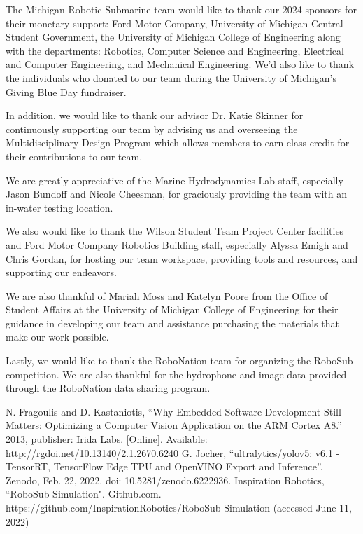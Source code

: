 \documentclass[conference]{IEEEtran}
\begin{document}
The Michigan Robotic Submarine team would like to thank our 2024 sponsors for their monetary support: Ford Motor Company, University of Michigan Central Student Government, the University of Michigan College of Engineering along with the departments: Robotics, Computer Science and Engineering, Electrical and Computer Engineering, and Mechanical Engineering. We'd also like to thank the individuals who donated to our team during the University of Michigan's Giving Blue Day fundraiser. 

In addition, we would like to thank our advisor Dr. Katie Skinner for continuously supporting our team by advising us and overseeing the Multidisciplinary Design Program which allows members to earn class credit for their contributions to our team.

We are greatly appreciative of the Marine Hydrodynamics Lab staff, especially Jason Bundoff and Nicole Cheesman, for graciously providing the team with an in-water testing location. 

We also would like to thank the Wilson Student Team Project Center facilities and Ford Motor Company Robotics Building staff, especially Alyssa Emigh and Chris Gordan, for hosting our team workspace, providing tools and resources, and supporting our endeavors. 

We are also thankful of Mariah Moss and Katelyn Poore from the Office of Student Affairs at the University of Michigan College of Engineering for their guidance in developing our team and assistance purchasing the materials that make our work possible. 

Lastly, we would like to thank the RoboNation team for organizing the RoboSub competition. We are also thankful for the hydrophone and image data provided through the RoboNation data sharing program.

\begin{thebibliography}{00}
 N. Fragoulis and D. Kastaniotis, “Why Embedded Software
Development Still Matters: Optimizing a Computer Vision Application
on the ARM Cortex A8.” 2013, publisher: Irida Labs. [Online].
Available: http://rgdoi.net/10.13140/2.1.2670.6240
 G. Jocher, ``ultralytics/yolov5: v6.1 - TensorRT, TensorFlow Edge TPU and OpenVINO Export and Inference”. Zenodo, Feb. 22, 2022. doi: 10.5281/zenodo.6222936.
 Inspiration Robotics, ``RoboSub-Simulation". Github.com. https://github.com/InspirationRobotics/RoboSub-Simulation (accessed June 11, 2022)

\end{thebibliography}
\end{document}
